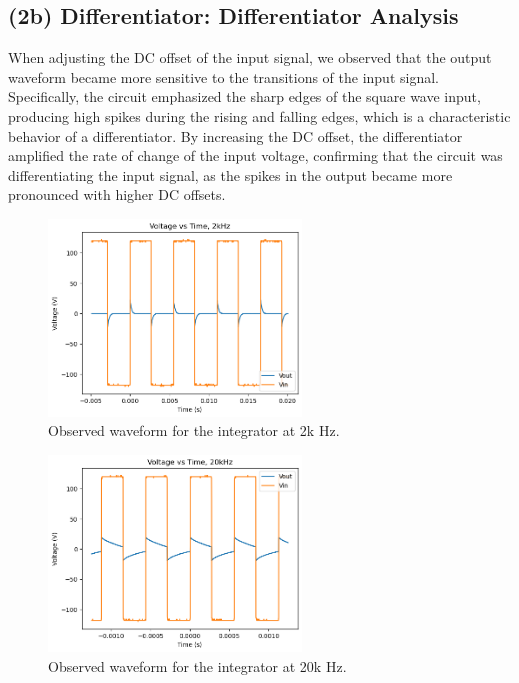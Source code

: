 \documentclass{article}
\begin{document}
\subsection{(2b) Differentiator: Differentiator Analysis}

When adjusting the DC offset of the input signal, we observed that the output 
waveform became more sensitive to the transitions of the input signal. 
Specifically, the circuit emphasized the sharp edges of the square wave input, 
producing high spikes during the rising and falling edges, which is a characteristic 
behavior of a differentiator. By increasing the DC offset, the differentiator 
amplified the rate of change of the input voltage, confirming that the circuit 
was differentiating the input signal, as the spikes in the output became more 
pronounced with higher DC offsets.

\begin{figure}[H]
    \centering
    \includegraphics[width=0.6\textwidth]{./img/Lab2_2b_2k.png}  %
    \caption{Observed waveform for the integrator at 2k Hz.}
\end{figure}

\begin{figure}[H]
    \centering
    \includegraphics[width=0.6\textwidth]{./img/Lab2_2b_20k.png}  %
    \caption{Observed waveform for the integrator at 20k Hz.}
\end{figure}
\end{document}
